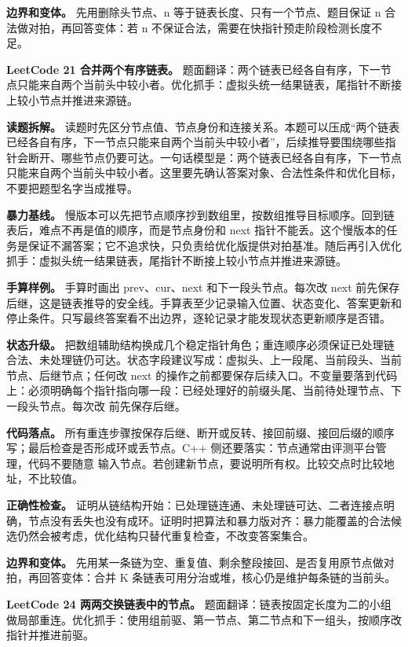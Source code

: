 \textbf{边界和变体。} 先用删除头节点、n 等于链表长度、只有一个节点、题目保证 n 合法做对拍，再回答变体：若 n 不保证合法，需要在快指针预走阶段检测长度不足。

\noindent\textbf{LeetCode 21 合并两个有序链表。} 题面翻译：两个链表已经各自有序，下一节点只能来自两个当前头中较小者。优化抓手：虚拟头统一结果链表，尾指针不断接上较小节点并推进来源链。

\textbf{读题拆解。} 读题时先区分节点值、节点身份和连接关系。本题可以压成“两个链表已经各自有序，下一节点只能来自两个当前头中较小者”，后续推导要围绕哪些指针会断开、哪些节点仍要可达。一句话模型是：两个链表已经各自有序，下一节点只能来自两个当前头中较小者。这里要先确认答案对象、合法性条件和优化目标，不要把题型名字当成推导。

\textbf{暴力基线。} 慢版本可以先把节点顺序抄到数组里，按数组推导目标顺序。回到链表后，难点不再是值的顺序，而是节点身份和 next 指针不能丢。这个慢版本的任务是保证不漏答案；它不追求快，只负责给优化版提供对拍基准。随后再引入优化抓手：虚拟头统一结果链表，尾指针不断接上较小节点并推进来源链。

\textbf{手算样例。} 手算时画出 prev、cur、next 和下一段头节点。每次改 next 前先保存后继，这是链表推导的安全线。手算表至少记录输入位置、状态变化、答案更新和停止条件。只写最终答案看不出边界，逐轮记录才能发现状态更新顺序是否错。

\textbf{状态升级。} 把数组辅助结构换成几个稳定指针角色；重连顺序必须保证已处理链合法、未处理链仍可达。状态字段建议写成：虚拟头、上一段尾、当前段头、当前节点、后继节点；任何改 next 的操作之前都要保存后续入口。不变量要落到代码上：必须明确每个指针指向哪一段：已经处理好的前缀头尾、当前待处理节点、下一段头节点。每次改  前先保存后继。

\textbf{代码落点。} 所有重连步骤按保存后继、断开或反转、接回前缀、接回后缀的顺序写；最后检查是否形成环或丢节点。C++ 侧还要落实：节点通常由评测平台管理，代码不要随意  输入节点。若创建新节点，要说明所有权。比较交点时比较地址，不比较值。

\textbf{正确性检查。} 证明从链结构开始：已处理链连通、未处理链可达、二者连接点明确，节点没有丢失也没有成环。证明时把算法和暴力版对齐：暴力能覆盖的合法候选仍然会被考虑，优化结构只替代重复检查，不改变答案集合。

\textbf{边界和变体。} 先用某一条链为空、重复值、剩余整段接回、是否复用原节点做对拍，再回答变体：合并 K 条链表可用分治或堆，核心仍是维护每条链的当前头。

\noindent\textbf{LeetCode 24 两两交换链表中的节点。} 题面翻译：链表按固定长度为二的小组做局部重连。优化抓手：使用组前驱、第一节点、第二节点和下一组头，按顺序改指针并推进前驱。

